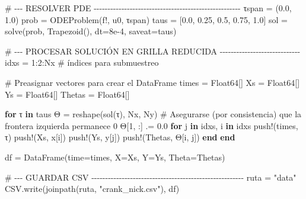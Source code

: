 \documentclass[
  spanish,
  us-letterpaper,
]{scrreprt}
\newenvironment{Shaded}{\begin{snugshade}}{\end{snugshade}}
\newcommand{\CommentTok}[1]{\textcolor[rgb]{0.37,0.37,0.37}{#1}}
\newcommand{\ControlFlowTok}[1]{\textcolor[rgb]{0.00,0.23,0.31}{\textbf{#1}}}
\newcommand{\DataTypeTok}[1]{\textcolor[rgb]{0.68,0.00,0.00}{#1}}
\newcommand{\FloatTok}[1]{\textcolor[rgb]{0.68,0.00,0.00}{#1}}
\newcommand{\FunctionTok}[1]{\textcolor[rgb]{0.28,0.35,0.67}{#1}}
\newcommand{\KeywordTok}[1]{\textcolor[rgb]{0.00,0.23,0.31}{\textbf{#1}}}
\newcommand{\NormalTok}[1]{\textcolor[rgb]{0.00,0.23,0.31}{#1}}
\newcommand{\OperatorTok}[1]{\textcolor[rgb]{0.37,0.37,0.37}{#1}}
\newcommand{\StringTok}[1]{\textcolor[rgb]{0.13,0.47,0.30}{#1}}
\theoremstyle{definition}
\theoremstyle{plain}
\theoremstyle{remark}
\begin{document}
\begin{Shaded}
\begin{Highlighting}[]
\CommentTok{\# {-}{-}{-} RESOLVER PDE {-}{-}{-}{-}{-}{-}{-}{-}{-}{-}{-}{-}{-}{-}{-}{-}{-}{-}{-}{-}{-}{-}{-}{-}{-}{-}{-}{-}{-}{-}{-}{-}{-}{-}{-}{-}{-}{-}{-}{-}{-}{-}{-}{-}{-}{-}{-}{-}{-}{-}{-}{-}{-}}
\NormalTok{τspan }\OperatorTok{=}\NormalTok{ (}\FloatTok{0.0}\NormalTok{, }\FloatTok{1.0}\NormalTok{)}
\NormalTok{prob }\OperatorTok{=} \FunctionTok{ODEProblem}\NormalTok{(f!, u0, τspan)}
\NormalTok{taus }\OperatorTok{=}\NormalTok{ [}\FloatTok{0.0}\NormalTok{, }\FloatTok{0.25}\NormalTok{, }\FloatTok{0.5}\NormalTok{, }\FloatTok{0.75}\NormalTok{, }\FloatTok{1.0}\NormalTok{]}
\NormalTok{sol }\OperatorTok{=} \FunctionTok{solve}\NormalTok{(prob, }\FunctionTok{Trapezoid}\NormalTok{(), dt}\OperatorTok{=}\FloatTok{8e{-}4}\NormalTok{, saveat}\OperatorTok{=}\NormalTok{taus)}

\CommentTok{\# {-}{-}{-} PROCESAR SOLUCIÓN EN GRILLA REDUCIDA {-}{-}{-}{-}{-}{-}{-}{-}{-}{-}{-}{-}{-}{-}{-}{-}{-}{-}{-}{-}{-}{-}{-}{-}{-}{-}{-}{-}{-}}
\NormalTok{idxs }\OperatorTok{=} \FloatTok{1}\OperatorTok{:}\FloatTok{2}\OperatorTok{:}\NormalTok{Nx  }\CommentTok{\# índices para submuestreo}

\CommentTok{\# Preasignar vectores para crear el DataFrame}
\NormalTok{times }\OperatorTok{=} \DataTypeTok{Float64}\NormalTok{[]}
\NormalTok{Xs }\OperatorTok{=} \DataTypeTok{Float64}\NormalTok{[]}
\NormalTok{Ys }\OperatorTok{=} \DataTypeTok{Float64}\NormalTok{[]}
\NormalTok{Thetas }\OperatorTok{=} \DataTypeTok{Float64}\NormalTok{[]}

\ControlFlowTok{for}\NormalTok{ τ }\KeywordTok{in}\NormalTok{ taus}
\NormalTok{    Θ }\OperatorTok{=} \FunctionTok{reshape}\NormalTok{(}\FunctionTok{sol}\NormalTok{(τ), Nx, Ny)}
    \CommentTok{\# Asegurarse (por consistencia) que la frontera izquierda permanece 0}
\NormalTok{    Θ[}\FloatTok{1}\NormalTok{, }\OperatorTok{:}\NormalTok{] }\OperatorTok{.=} \FloatTok{0.0}
    \ControlFlowTok{for}\NormalTok{ j }\KeywordTok{in}\NormalTok{ idxs, i }\KeywordTok{in}\NormalTok{ idxs}
        \FunctionTok{push!}\NormalTok{(times, τ)}
        \FunctionTok{push!}\NormalTok{(Xs, x[i])}
        \FunctionTok{push!}\NormalTok{(Ys, y[j])}
        \FunctionTok{push!}\NormalTok{(Thetas, Θ[i, j])}
    \ControlFlowTok{end}
\ControlFlowTok{end}

\NormalTok{df }\OperatorTok{=} \FunctionTok{DataFrame}\NormalTok{(time}\OperatorTok{=}\NormalTok{times, X}\OperatorTok{=}\NormalTok{Xs, Y}\OperatorTok{=}\NormalTok{Ys, Theta}\OperatorTok{=}\NormalTok{Thetas)}

\CommentTok{\# {-}{-}{-} GUARDAR CSV {-}{-}{-}{-}{-}{-}{-}{-}{-}{-}{-}{-}{-}{-}{-}{-}{-}{-}{-}{-}{-}{-}{-}{-}{-}{-}{-}{-}{-}{-}{-}{-}{-}{-}{-}{-}{-}{-}{-}{-}{-}{-}{-}{-}{-}{-}{-}{-}{-}{-}{-}{-}{-}{-}{-}}
\NormalTok{ruta }\OperatorTok{=} \StringTok{"data"}
\NormalTok{CSV.}\FunctionTok{write}\NormalTok{(}\FunctionTok{joinpath}\NormalTok{(ruta, }\StringTok{"crank\_nick.csv"}\NormalTok{), df)}
\end{Highlighting}
\end{Shaded}
\end{document}
